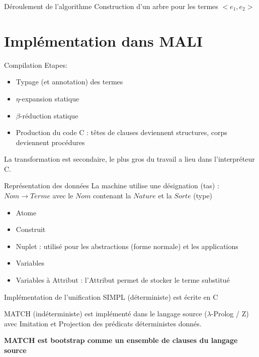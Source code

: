 \documentclass[aspectratio=169]{beamer}
\begin{document}
\begin{frame}{Déroulement de l'algorithme}
  Construction d'un arbre pour les termes $<e_1, e_2>$
  \begin{algorithmic}
    \EndWhile
    \EndProcedure
  \end{algorithmic}
\end{frame}

\section{Implémentation dans MALI}

\begin{frame}{Compilation}
  Etapes:
  \begin{itemize}
  \item Typage (et annotation) des termes
  \item $\eta$-expansion statique
  \item $\beta$-réduction statique
  \item Production du code C : têtes de clauses deviennent structures, corps deviennent procédures
  \end{itemize}
  La transformation est secondaire, le plus gros du travail a lieu dans l'interpréteur C.
\end{frame}

\begin{frame}{Représentation des données}
  La machine utilise une désignation (tas) : $Nom \rightarrow Terme$
  avec le $Nom$ contenant la $Nature$ et la $Sorte$ (type)
  \begin{itemize}
  \item Atome
  \item Construit
  \item Nuplet : utilisé pour les abstractions (forme normale) et les applications
  \item Variables
  \item Variables à Attribut : l'Attribut permet de stocker le terme substitué
  \end{itemize}
\end{frame}

\begin{frame}{Implémentation de l'unification}
  SIMPL (déterministe) est écrite en C

  MATCH (indéterministe) est implémenté dans le langage source ($\lambda$-Prolog / Z) avec Imitation et Projection des prédicats déterministes donnés.

  \textbf{MATCH est bootstrap comme un ensemble de clauses du langage source}
\end{frame}
\end{document}
